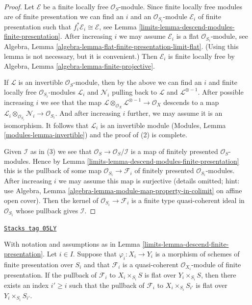 \begin{proof}

Let $\mathcal{E}$ be a finite locally free $\mathcal{O}_S$-module. Since
finite locally free modules are of finite presentation we can find an $i$
and an $\mathcal{O}_{S_i}$-module $\mathcal{E}_i$ of finite presentation
such that $f_i^*\mathcal{E}_i \cong \mathcal{E}$, see
Lemma \ref{limits-lemma-descend-modules-finite-presentation}.
After increasing $i$ we may assume $\mathcal{E}_i$ is a flat
$\mathcal{O}_{S_i}$-module, see
Algebra, Lemma \ref{algebra-lemma-flat-finite-presentation-limit-flat}.
(Using this lemma is not necessary, but it is convenient.)
Then $\mathcal{E}_i$ is finite locally free by
Algebra, Lemma \ref{algebra-lemma-finite-projective}.

\medskip\noindent
If $\mathcal{L}$ is an invertible $\mathcal{O}_S$-module,
then by the above we can find an $i$ and finite locally
free $\mathcal{O}_{S_i}$-modules $\mathcal{L}_i$
and $\mathcal{N}_i$ pulling back to $\mathcal{L}$ and
$\mathcal{L}^{\otimes -1}$. After possible increasing
$i$ we see that the map
$\mathcal{L} \otimes_{\mathcal{O}_X} \mathcal{L}^{\otimes -1}
\to \mathcal{O}_X$ descends to a map
$\mathcal{L}_i \otimes_{\mathcal{O}_{S_i}} \mathcal{N}_i \to
\mathcal{O}_{S_i}$. And after increasing $i$ further, we
may assume it is an isomorphism. It follows that
$\mathcal{L}_i$ is an invertible module
(Modules, Lemma \ref{modules-lemma-invertible}) and
the proof of (2) is complete.

\medskip\noindent
Given $\mathcal{I}$ as in (3) we see that
$\mathcal{O}_S \to \mathcal{O}_S/\mathcal{I}$
is a map of finitely presented $\mathcal{O}_S$-modules.
Hence by Lemma \ref{limits-lemma-descend-modules-finite-presentation}
this is the pullback of some
map $\mathcal{O}_{S_i} \to \mathcal{F}_i$ of finitely
presented $\mathcal{O}_{S_i}$-modules. After increasing $i$
we may assume this map is surjective (details omitted; hint: use
Algebra, Lemma \ref{algebra-lemma-module-map-property-in-colimit}
on affine open cover). Then the kernel of $\mathcal{O}_{S_i} \to \mathcal{F}_i$
is a finite type quasi-coherent ideal in $\mathcal{O}_{S_i}$
whose pullback gives $\mathcal{I}$.
\end{proof}

\begin{lemma}
\label{limits-lemma-descend-module-flat-finite-presentation}
\href{https://stacks.math.columbia.edu/tag/05LY}{\texttt{Stacks tag 05LY}}

With notation and assumptions as in
Lemma \ref{limits-lemma-descend-finite-presentation}.
Let $i \in I$.
Suppose that $\varphi_i : X_i \to Y_i$ is a morphism of schemes
of finite presentation over $S_i$ and that $\mathcal{F}_i$ is a
quasi-coherent $\mathcal{O}_{X_i}$-module of finite presentation.
If the pullback of $\mathcal{F}_i$ to $X_i \times_{S_i} S$ is flat
over $Y_i \times_{S_i} S$, then there exists an index $i' \geq i$
such that the pullback of $\mathcal{F}_i$ to $X_i \times_{S_i} S_{i'}$
is flat over $Y_i \times_{S_i} S_{i'}$.
\end{lemma}

